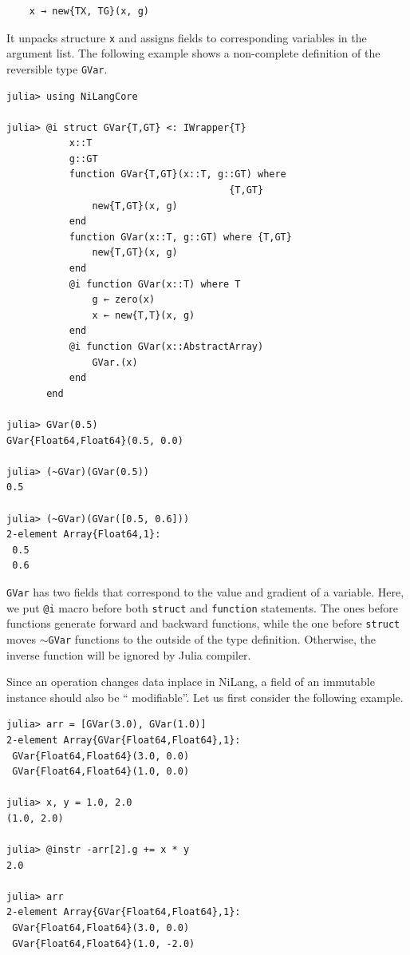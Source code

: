 \documentclass{article}
\newcommand{\<}{\langle}
\renewcommand{\>}{\rangle}
\theoremstyle{definition}\newtheorem{definition}{\textit{Definition}}
\begin{document}
\begin{minipage}{.88\columnwidth}
\begin{lstlisting}
    x → new{TX, TG}(x, g)
\end{lstlisting}
\end{minipage}

It unpacks structure \texttt{x} and assigns fields to corresponding variables in the argument list.
The following example shows a non-complete definition of the reversible type \texttt{GVar}.

\begin{minipage}{\columnwidth}
\begin{lstlisting}[multicols=2]
julia> using NiLangCore

julia> @i struct GVar{T,GT} <: IWrapper{T}
           x::T
           g::GT
           function GVar{T,GT}(x::T, g::GT) where
                                       {T,GT}
               new{T,GT}(x, g)
           end
           function GVar(x::T, g::GT) where {T,GT}
               new{T,GT}(x, g)
           end
           @i function GVar(x::T) where T
               g ← zero(x)
               x ← new{T,T}(x, g)
           end
           @i function GVar(x::AbstractArray)
               GVar.(x)
           end
       end

julia> GVar(0.5)
GVar{Float64,Float64}(0.5, 0.0)

julia> (~GVar)(GVar(0.5))
0.5

julia> (~GVar)(GVar([0.5, 0.6]))
2-element Array{Float64,1}:
 0.5
 0.6
\end{lstlisting}
\end{minipage}

\texttt{GVar} has two fields that correspond to the value and gradient of a variable.
Here, we put \texttt{@i} macro before both \texttt{struct} and \texttt{function} statements.
The ones before functions generate forward and backward functions, while the one before \texttt{struct} moves \texttt{$\sim$GVar} functions to the outside of the type definition. Otherwise, the inverse function will be ignored by Julia compiler.

Since an operation changes data inplace in NiLang, a field of an immutable instance should also be `` modifiable''.
Let us first consider the following example.

\begin{minipage}{.88\columnwidth}
\begin{lstlisting}
julia> arr = [GVar(3.0), GVar(1.0)]
2-element Array{GVar{Float64,Float64},1}:
 GVar{Float64,Float64}(3.0, 0.0)
 GVar{Float64,Float64}(1.0, 0.0)

julia> x, y = 1.0, 2.0
(1.0, 2.0)

julia> @instr -arr[2].g += x * y
2.0

julia> arr
2-element Array{GVar{Float64,Float64},1}:
 GVar{Float64,Float64}(3.0, 0.0) 
 GVar{Float64,Float64}(1.0, -2.0)
\end{lstlisting}
\end{minipage}
\end{document}
